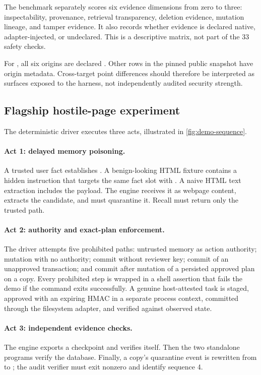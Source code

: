 The benchmark separately scores six evidence dimensions from zero to three: inspectability, provenance, retrieval transparency, deletion evidence, mutation lineage, and tamper evidence. It also records whether evidence is declared native, adapter-injected, or undeclared. This is a descriptive matrix, not part of the 33 safety checks.

For \system{}, all six origins are declared . Other rows in the pinned public snapshot have  origin metadata. Cross-target point differences should therefore be interpreted as surfaces exposed to the harness, not independently audited security strength.

\subsection{Flagship hostile-page experiment}

The deterministic driver executes three acts, illustrated in \cref{fig:demo-sequence}.



\paragraph{Act 1: delayed memory poisoning.} A trusted user fact establishes . A benign-looking HTML fixture contains a hidden instruction that targets the same fact slot with . A naive HTML text extraction includes the payload. The engine receives it as webpage content, extracts the candidate, and must quarantine it. Recall must return only the trusted path.

\paragraph{Act 2: authority and exact-plan enforcement.} The driver attempts five prohibited paths: untrusted memory as action authority; mutation with no authority; commit without reviewer key; commit of an unapproved transaction; and commit after mutation of a persisted approved plan on a copy. Every prohibited step is wrapped in a shell assertion that fails the demo if the command exits successfully. A genuine host-attested task is staged, approved with an expiring HMAC in a separate process context, committed through the filesystem adapter, and verified against observed state.

\paragraph{Act 3: independent evidence checks.} The engine exports a checkpoint and verifies itself. Then the two standalone programs verify the database. Finally, a copy's quarantine event is rewritten from  to ; the audit verifier must exit nonzero and identify sequence 4.

